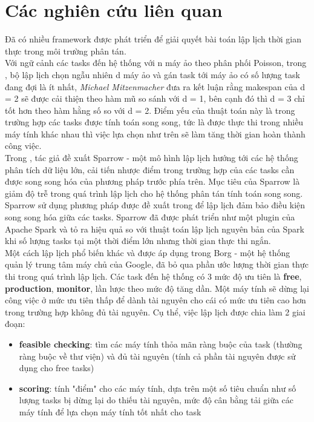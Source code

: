 \documentclass{my_style}
\begin{document}
\section{Các nghiên cứu liên quan}
Đã có nhiều framework được phát triển để giải quyết bài toán lập lịch thời gian thực trong môi trường phân tán.\\
Với ngữ cảnh các tasks đến hệ thống với n máy ảo theo phân phối Poisson, trong \cite{21}, bộ lập lịch chọn ngẫu nhiên d máy ảo và gán task tới máy ảo có số lượng task đang đợi là ít nhất, \textit{Michael Mitzenmacher} đưa ra kết luận rằng makespan của d = 2 sẽ được cải thiện theo hàm mũ so sánh với d = 1, bên cạnh đó thì d = 3 chỉ tốt hơn theo hàm hằng số so với d = 2. Điểm yếu của thuật toán này là trong trường hợp các tasks được tính toán song song, tức là được thực thi trong nhiều máy tính khác nhau thì việc lựa chọn như trên sẽ làm tăng thời gian hoàn thành công việc. \\
Trong \cite{20}, tác giả đề xuất Sparrow - một mô hình lập lịch hướng tới các hệ thống phân tích dữ liệu lớn, cải tiến nhược điểm trong trường hợp của các tasks cần được song song hóa của phương pháp trước phía trên. Mục tiêu của Sparrow là giảm độ trễ trong quá trình lập lịch cho hệ thống phân tán tính toán song song. Sparrow sử dụng phương pháp được đề xuất trong\cite{22} để lập lịch đảm bảo điều kiện song song hóa giữa các tasks. Sparrow đã được phát triển như một plugin của Apache Spark và tỏ ra hiệu quả so với thuật toán lập lịch nguyên bản của Spark khi số lượng tasks tại một thời điểm lớn nhưng thời gian thực thi ngắn. \\
Một cách lập lịch phổ biến khác và được áp dụng trong Borg\cite{17}\cite{19} - một hệ thống quản lý trung tâm máy chủ của Google, đã bỏ qua phần ước lượng thời gian thực thi trong quá trình lập lịch. Các task đến hệ thống có 3 mức độ ưu tiên là \textbf{free}, \textbf{production}, \textbf{monitor}, lần lược theo mức độ tăng dần. Một máy tính sẽ dừng lại công việc ở mức ưu tiên thấp để dành tài nguyên cho cái có mức ưu tiên cao hơn trong trường hợp không đủ tài nguyên. Cụ thể, việc lập lịch được chia làm 2 giai đoạn: 
\begin{itemize}
	\item \textbf{feasible checking}: tìm các máy tính thỏa mãn ràng buộc của task (thường ràng buộc về thư viện) và đủ tài nguyên (tính cả phần tài nguyên được sử dụng cho free tasks)
	\item \textbf{scoring}: tính "điểm" cho các máy tính, dựa trên một số tiêu chuẩn như số lượng tasks bị dừng lại do thiếu tài nguyên, mức độ cân bằng tải giữa các máy tính để lựa chọn máy tính tốt nhất cho task
\end{itemize}
\end{document}
